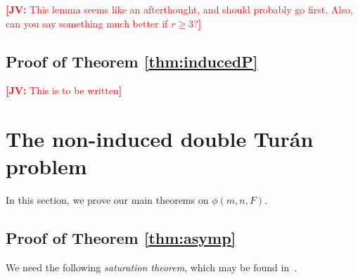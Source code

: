 \documentclass[12pt]{article}
\newcommand{\jv}[1]{\textcolor{red}{\textbf{[JV: } #1\textbf{]}}}
\begin{document}
\jv{This lemma seems like an afterthought, and should probably go first. Also, can you say something much better if $r \geq 3$?}

\subsection{Proof of Theorem \ref{thm:inducedP}}

\jv{This is to be written}
\begin{comment}
According to Theorem \ref{thm:pm}.2, 
$\phi(n,n,P) = (1/2 + o(1))n^{5/2}$. So to prove Theorem \ref{thm:inducedP}, it is sufficient to show 
$\phi^*(n,n,P) = o(n^{5/2})$. To this end, let $G_1,G_2,\dots,G_n$ be induced and double $P$-free. 
Form the graph $H$ with vertex set $[2n]$ such that 
\[ E(H) = \{\{i,j\},\{j,k\},\{i,k\} : \{i,j\} \in E(G_k)\}.\]
The number of triangles in $H$ is exactly $\sum_{i = 1}^n e(G_i)$. By Theorem \ref{thm:pm}.1, 
this is $O(n^{5/2}) = o(n^3)$, and therefore there exists a set $E$ of $M = o(n^2)$ edges of $H$ 
such that every triangle in $H$ contains at least one edge from $E$. Let $d(e)$ be the number of triangles in $H$ containing an edge $e \in M$. Suppose
\[ \sum_{i = 1}^n e(G_i) \geq \epssilon n^{5/2}.\]
Then 
\[ \sum_{e \in M} d(e) \geq \epsilon n^{5/2}.\]
Suppose $v \in V(H)$ is contained in $r = r(v)$ edges of $E$, say $e_1,e_2,\dots,e_r \in E$. Then the number of pairs of triangles in $H$ such that one triangle contains some $e_i$ and the other contains some $e_j$ with $i \neq j$ is at least 
\[ \sum_{i = 1}^r d(e_i) - 2n.\]
So the total number of such pairs of triangles in $H$ 
is at least 
\[ \sum_{v \in V(H)} \sum_{i = 1}^{r(v)} d(e_i) - 2n^2.\]
\end{comment}





\section{The non-induced double Tur\'{a}n problem}

In this section, we prove our main theorems on $\phi(m,n,F)$. 

\subsection{Proof of Theorem \ref{thm:asymp}}

We need the following \textit{saturation theorem}, which may be found in~\cite{ErdosSimonovits1983}.
\end{document}
